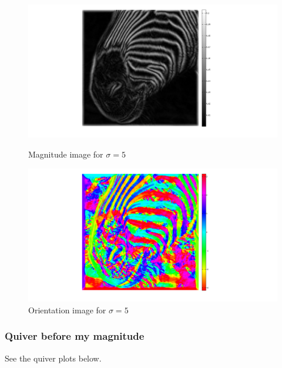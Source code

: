 \documentclass[a4paper,10pt]{article}
\begin{document}
\begin{figure}[ht]
\begin{minipage}[b]{0.45\linewidth}
\centering
\includegraphics[width=\textwidth]{zebra_img/magnitude_sigma5_colorbar}
\caption{Magnitude image for $\sigma=5$}
\end{minipage}
\hspace{0.1cm}
\begin{minipage}[b]{0.45\linewidth}
\centering
\includegraphics[width=\textwidth]{zebra_img/orientation_sigma5}
\caption{Orientation image for $\sigma=5$}
\end{minipage}
\end{figure}


\subsubsection{Quiver before my magnitude}
See the quiver plots below.
\end{document}
